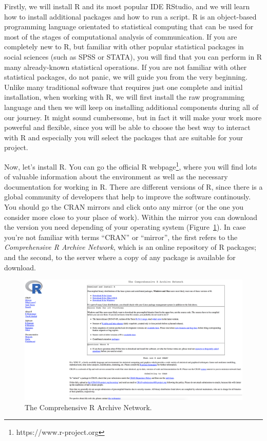 Firstly, we will install R and its most popular IDE RStudio, and we
will learn how to install additional packages and how to run a
script. R is an object-based programming language
orientated to statistical computing that can be used for most of the
stages of computational analysis of communication.  If you are
completely new to R, but familiar with other popular
statistical packages in social sciences (such as SPSS or STATA), you
will find that you can perform in R many already-known statistical
operations. If you are not familiar with other statistical packages,
do not panic, we will guide you from the very beginning. Unlike
many traditional software that requires just one complete and initial
installation, when working with R, we will first install the raw
programming language and then we will keep on installing additional
components during all of our journey. It might sound cumbersome, but
in fact it will make your work more powerful and flexible, since you
will be able to choose the best way to interact with R and especially
you will select the packages that are suitable for your project.

Now, let's install R. You can go the official R
webpage\footnote{https://www.r-project.org}, where you will find lots
of valuable information about the environment as well as the necessary
documentation for working in R.  There are different versions of R,
since there is a global community of developers that help to improve
the software continously. You should go the CRAN mirrors and click onto
any mirror (or the one you consider more close to your place of
work). Within the mirror you can download the version you need
depending of your operating system (Figure~\ref{fig:cran}). In case
you're not familiar with terms ``CRAN'' or ``mirror'', the first
refers to the \textit{Comprehensive R Archive Network}, which is an
online repository of R packages; and the second, to the server where a
copy of any package is available for download.



\begin{figure}
\centering
\includegraphics[width=0.9\linewidth]{figures/ch3_cran}
\caption{The Comprehensive R Archive Network.}
\label{fig:cran}
\end{figure}

